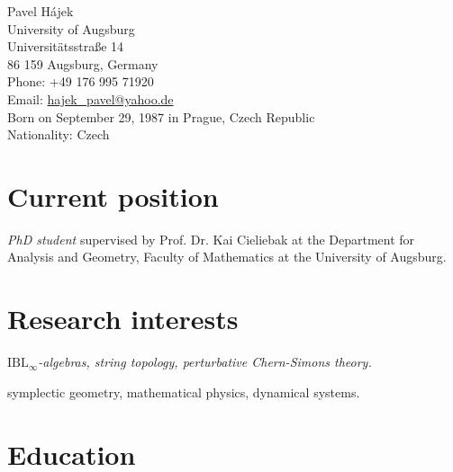 \documentclass[a4paper,12pt]{article}
\begin{document}
{\Large Pavel H\'ajek}\\[.2cm]
University of Augsburg\\
Universitätsstraße 14 \\
86 159 Augsburg, Germany \\[.2cm]
Phone: +49 176 995 71920\\
Email: \href{mailto:hajek_pavel@yahoo.de}{hajek\_pavel@yahoo.de}\\[.5cm]
Born on September 29, 1987 in Prague, Czech Republic\\
Nationality:  Czech

\section*{Current position}

\emph{PhD student} supervised by Prof. Dr. Kai Cieliebak at the Department for Analysis and Geometry, Faculty of Mathematics at the University of Augsburg.

\section*{Research interests}

\begin{description}[font=\normalfont]
\item[Actively:] \emph{$\mathrm{IBL}_\infty$-algebras, string topology, perturbative Chern-Simons theory.}
\item[Generally:] symplectic geometry, mathematical physics, dynamical systems.%
\end{description}

\section*{Education}
\end{document}
